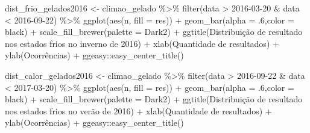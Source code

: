 \documentclass[
]{article}
\newenvironment{Shaded}{\begin{snugshade}}{\end{snugshade}}
\newcommand{\AttributeTok}[1]{\textcolor[rgb]{0.77,0.63,0.00}{#1}}
\newcommand{\DecValTok}[1]{\textcolor[rgb]{0.00,0.00,0.81}{#1}}
\newcommand{\FunctionTok}[1]{\textcolor[rgb]{0.00,0.00,0.00}{#1}}
\newcommand{\NormalTok}[1]{#1}
\newcommand{\OtherTok}[1]{\textcolor[rgb]{0.56,0.35,0.01}{#1}}
\newcommand{\SpecialCharTok}[1]{\textcolor[rgb]{0.00,0.00,0.00}{#1}}
\newcommand{\StringTok}[1]{\textcolor[rgb]{0.31,0.60,0.02}{#1}}
\begin{document}
\begin{Shaded}
\begin{Highlighting}[]
\NormalTok{dist\_frio\_gelados2016 }\OtherTok{\textless{}{-}}\NormalTok{ climao\_gelado }\SpecialCharTok{\%\textgreater{}\%} 
  \FunctionTok{filter}\NormalTok{(data }\SpecialCharTok{\textgreater{}} \StringTok{\textquotesingle{}2016{-}03{-}20\textquotesingle{}} \SpecialCharTok{\&}\NormalTok{ data }\SpecialCharTok{\textless{}} \StringTok{\textquotesingle{}2016{-}09{-}22\textquotesingle{}}\NormalTok{) }\SpecialCharTok{\%\textgreater{}\%}
  \FunctionTok{ggplot}\NormalTok{(}\FunctionTok{aes}\NormalTok{(n, }\AttributeTok{fill =}\NormalTok{ res)) }\SpecialCharTok{+} 
  \FunctionTok{geom\_bar}\NormalTok{(}\AttributeTok{alpha =}\NormalTok{ .}\DecValTok{6}\NormalTok{,}\AttributeTok{color =} \StringTok{\textquotesingle{}black\textquotesingle{}}\NormalTok{) }\SpecialCharTok{+} 
  \FunctionTok{scale\_fill\_brewer}\NormalTok{(}\AttributeTok{palette =} \StringTok{\textquotesingle{}Dark2\textquotesingle{}}\NormalTok{) }\SpecialCharTok{+}
  \FunctionTok{ggtitle}\NormalTok{(}\StringTok{\textquotesingle{}Distribuição de resultado nos estados frios no inverno de 2016\textquotesingle{}}\NormalTok{) }\SpecialCharTok{+}
  \FunctionTok{xlab}\NormalTok{(}\StringTok{\textquotesingle{}Quantidade de resultados\textquotesingle{}}\NormalTok{) }\SpecialCharTok{+} \FunctionTok{ylab}\NormalTok{(}\StringTok{\textquotesingle{}Ocorrências\textquotesingle{}}\NormalTok{) }\SpecialCharTok{+}
\NormalTok{  ggeasy}\SpecialCharTok{::}\FunctionTok{easy\_center\_title}\NormalTok{()}

\NormalTok{dist\_calor\_gelados2016 }\OtherTok{\textless{}{-}}\NormalTok{ climao\_gelado }\SpecialCharTok{\%\textgreater{}\%} 
  \FunctionTok{filter}\NormalTok{(data }\SpecialCharTok{\textgreater{}} \StringTok{\textquotesingle{}2016{-}09{-}22\textquotesingle{}} \SpecialCharTok{\&}\NormalTok{ data }\SpecialCharTok{\textless{}} \StringTok{\textquotesingle{}2017{-}03{-}20\textquotesingle{}}\NormalTok{) }\SpecialCharTok{\%\textgreater{}\%}
  \FunctionTok{ggplot}\NormalTok{(}\FunctionTok{aes}\NormalTok{(n, }\AttributeTok{fill =}\NormalTok{ res)) }\SpecialCharTok{+} 
  \FunctionTok{geom\_bar}\NormalTok{(}\AttributeTok{alpha =}\NormalTok{ .}\DecValTok{6}\NormalTok{,}\AttributeTok{color =} \StringTok{\textquotesingle{}black\textquotesingle{}}\NormalTok{) }\SpecialCharTok{+} 
  \FunctionTok{scale\_fill\_brewer}\NormalTok{(}\AttributeTok{palette =} \StringTok{\textquotesingle{}Dark2\textquotesingle{}}\NormalTok{) }\SpecialCharTok{+}
  \FunctionTok{ggtitle}\NormalTok{(}\StringTok{\textquotesingle{}Distribuição de resultado nos estados frios no verão de 2016\textquotesingle{}}\NormalTok{) }\SpecialCharTok{+}
  \FunctionTok{xlab}\NormalTok{(}\StringTok{\textquotesingle{}Quantidade de resultados\textquotesingle{}}\NormalTok{) }\SpecialCharTok{+} \FunctionTok{ylab}\NormalTok{(}\StringTok{\textquotesingle{}Ocorrências\textquotesingle{}}\NormalTok{) }\SpecialCharTok{+}
\NormalTok{  ggeasy}\SpecialCharTok{::}\FunctionTok{easy\_center\_title}\NormalTok{()}



\end{Highlighting}
\end{Shaded}
\end{document}
